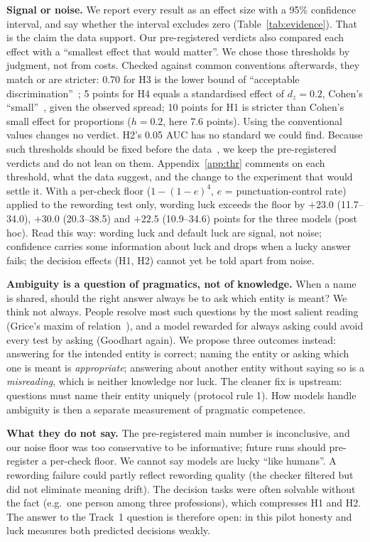 \documentclass[10pt]{article}
\begin{document}
\textbf{Signal or noise.} We report every result as an effect size with a 95\% confidence interval, and say whether the interval excludes zero (Table~\ref{tab:evidence}). That is the claim the data support. Our pre-registered verdicts also compared each effect with a ``smallest effect that would matter''. We chose those thresholds by judgment, not from costs. Checked against common conventions afterwards, they match or are stricter: 0.70 for H3 is the lower bound of ``acceptable discrimination''~\cite{hosmer}; 5 points for H4 equals a standardised effect of $d_z=0.2$, Cohen's ``small''~\cite{cohen88}, given the observed spread; 10 points for H1 is stricter than Cohen's small effect for proportions ($h=0.2$, here 7.6 points). Using the conventional values changes no verdict. H2's 0.05 AUC has no standard we could find. Because such thresholds should be fixed before the data~\cite{lakens}, we keep the pre-registered verdicts and do not lean on them. Appendix~\ref{app:thr} comments on each threshold, what the data suggest, and the change to the experiment that would settle it. With a per-check floor ($1-(1-e)^4$, $e$ = punctuation-control rate) applied to the rewording test only, wording luck exceeds the floor by $+23.0$ (11.7--34.0), $+30.0$ (20.3--38.5) and $+22.5$ (10.9--34.6) points for the three models (post hoc). Read this way: wording luck and default luck are signal, not noise; confidence carries some information about luck and drops when a lucky answer fails; the decision effects (H1, H2) cannot yet be told apart from noise.

\textbf{Ambiguity is a question of pragmatics, not of knowledge.} When a name is shared, should the right answer always be to ask which entity is meant? We think not always. People resolve most such questions by the most salient reading (Grice's maxim of relation~\cite{grice}), and a model rewarded for always asking could avoid every test by asking (Goodhart again). We propose three outcomes instead: answering for the intended entity is correct; naming the entity or asking which one is meant is \emph{appropriate}; answering about another entity without saying so is a \emph{misreading}, which is neither knowledge nor luck. The cleaner fix is upstream: questions must name their entity uniquely (protocol rule 1). How models handle ambiguity is then a separate measurement of pragmatic competence.

\textbf{What they do not say.} The pre-registered main number is inconclusive, and our noise floor was too conservative to be informative; future runs should pre-register a per-check floor. We cannot say models are lucky ``like humans''. A rewording failure could partly reflect rewording quality (the checker filtered but did not eliminate meaning drift). The decision tasks were often solvable without the fact (e.g.\ one person among three professions), which compresses H1 and H2. The answer to the Track~1 question is therefore open: in this pilot honesty and luck measures both predicted decisions weakly.
\end{document}
